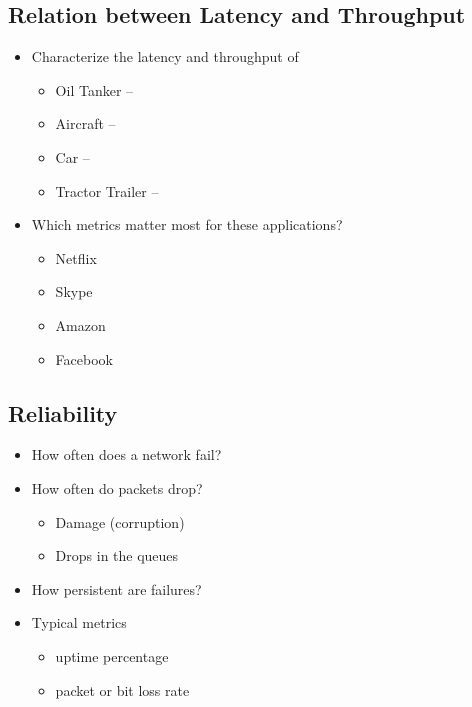 \subsection{Relation between Latency and Throughput}
\begin{itemize}[nosep]
    \item Characterize the latency and throughput of
          \begin{itemize}[nosep]
              \item Oil Tanker --
              \item Aircraft --
              \item Car --
              \item Tractor Trailer --
          \end{itemize}
    \item Which metrics matter most for these applications?
          \begin{itemize}[nosep]
              \item Netflix
              \item Skype
              \item Amazon
              \item Facebook
          \end{itemize}
\end{itemize}
\subsection{Reliability}
\begin{itemize}[nosep]
    \item How often does a network fail?
    \item How often do packets drop?
          \begin{itemize}[nosep]
              \item Damage (corruption)
              \item Drops in the queues
          \end{itemize}
    \item How persistent are failures?
    \item Typical metrics
          \begin{itemize}[nosep]
              \item uptime percentage
              \item packet or bit loss rate
          \end{itemize}
\end{itemize}
